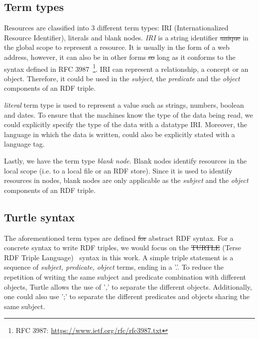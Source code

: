 \subsection{Term types}
Resources are classified into 3 different term types: IRI (Internationalized Resource Identifier),
literals and blank nodes.  \textit{IRI} is a  string identifier \sout{unique} in the global scope to
represent a resource. It is usually in the form of a web address, however, it can
also be in other forms \sout{so} long as it conforms to the syntax defined in
RFC 3987~\footnote{RFC 3987: \url{https://www.ietf.org/rfc/rfc3987.txt}}.
 IRI can represent a relationship, a concept or an object. Therefore, it could be
used in the \textit{subject}, the \textit{predicate} and the \textit{object} components of
an RDF triple.

 \textit{literal} term type is used to represent a value such as strings, numbers, boolean and dates.
To ensure that the machines know the type of the data being read, we could
explicitly specify the type of the data with a datatype IRI. Moreover, the
language in which the data is written, could also be explicitly stated with
a language tag.

Lastly, we have the term type \textit{blank node}. Blank nodes identify resources
in the local scope (i.e. to a local file or an RDF store). Since it is used to
identify resources in nodes, blank nodes are only applicable as the \textit{subject}
and the \textit{object} components of an RDF triple.


\subsection{Turtle syntax}
\label{sec:turtle_syntax}


The aforementioned term types are defined \sout{for} abstract RDF syntax. For a concrete syntax to write
RDF triples, we would focus on the \sout{TURTLE} (Terse RDF Triple Language)~\cite{turtle_syntax}
syntax in this work. A simple triple statement is a sequence of
\textit{subject, predicate, object} terms, ending in a '.'.
To reduce the repetition of writing the same subject and predicate combination with
different objects, Turtle allows the use of ',' to separate the different objects.
Additionally, one could also use ';' to separate the different predicates and objects sharing the
same subject. 


